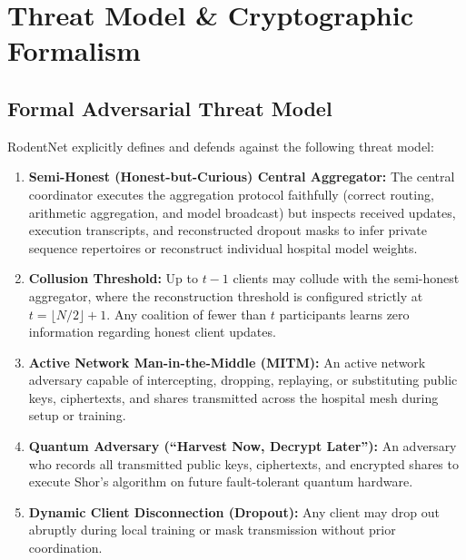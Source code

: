 \documentclass[11pt,a4paper]{report}
\begin{document}
\chapter{Threat Model \& Cryptographic Formalism}
\label{chap:security}

\section{Formal Adversarial Threat Model}
RodentNet explicitly defines and defends against the following threat model:
\begin{enumerate}[itemsep=2pt]
  \item \textbf{Semi-Honest (Honest-but-Curious) Central Aggregator:} The central coordinator executes the aggregation protocol faithfully (correct routing, arithmetic aggregation, and model broadcast) but inspects received updates, execution transcripts, and reconstructed dropout masks to infer private sequence repertoires or reconstruct individual hospital model weights.
  \item \textbf{Collusion Threshold:} Up to $t - 1$ clients may collude with the semi-honest aggregator, where the reconstruction threshold is configured strictly at $t = \lfloor N/2 \rfloor + 1$. Any coalition of fewer than $t$ participants learns zero information regarding honest client updates.
  \item \textbf{Active Network Man-in-the-Middle (MITM):} An active network adversary capable of intercepting, dropping, replaying, or substituting public keys, ciphertexts, and shares transmitted across the hospital mesh during setup or training.
  \item \textbf{Quantum Adversary (``Harvest Now, Decrypt Later''):} An adversary who records all transmitted public keys, ciphertexts, and encrypted shares to execute Shor's algorithm on future fault-tolerant quantum hardware.
  \item \textbf{Dynamic Client Disconnection (Dropout):} Any client may drop out abruptly during local training or mask transmission without prior coordination.
\end{enumerate}
\end{document}
